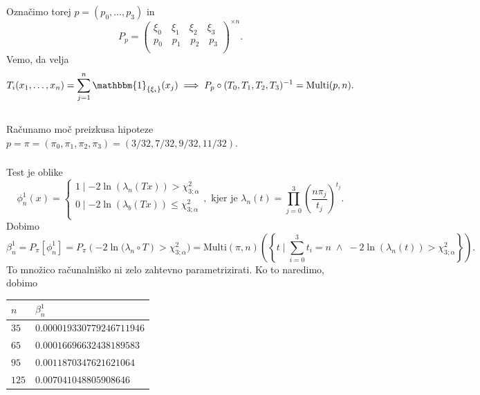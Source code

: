 \documentclass[ letterpaper, titlepage, fleqn]{article}
\newcommand{\ind}{\mathbbm{1}}
\begin{document}
\section{}
Označimo torej $p = (p_0, \dots, p_3)$ in
$$
P_p = \left(
\begin{array}{ll}
\xi_0 \quad \xi_1 \quad \xi_2 \quad \xi_3 \\
p_0 \quad p_1 \quad p_2 \quad p_3 \\
\end{array}
\right)^{\times n}.
$$
Vemo, da velja
$$T_i(x_1, \dots, x_n) = \sum_{j=1}^n \ind_{\{\xi_i\}}(x_j) \implies P_p \circ (T_0, T_1, T_2, T_{3})^{-1} = \text{Multi}(p,n).$$
\subsection{}
Računamo moč preizkusa hipoteze $p = \pi = (\pi_0, \pi_1, \pi_2, \pi_3) =  (3/32, 7/32, 9/32, 11/32)$.
\subsubsection{}
Test je oblike
$$
\phi^1_n(x)= 
\begin{cases}
1 \mid  -2 \ln(\lambda_n(Tx)) > \chi_{3; \alpha}^2 \\
0 \mid  -2 \ln(\lambda_b(Tx)) \leq \chi_{3; \alpha}^2 \\
\end{cases}, \text{ kjer je }
\lambda_n(t) = \prod_{j=0}^3 \left(\frac{n \pi_j}{t_j}\right)^{t_j}.
$$
Dobimo
\begin{equation*}
\beta^1_n = P_\pi[\phi^1_n] = P_\pi\left(-2\ln(\lambda_n \circ T\right) > \chi_{3;\alpha}^2) =
 \text{Multi}(\pi,n)\left(\left\{t\mid \sum_{i=0}^3 t_i = n \;\land\; -2\ln(\lambda_n(t)) > \chi_{3;\alpha}^2\right\}\right).
\end{equation*}
To množico računalniško ni zelo zahtevno parametrizirati. Ko to naredimo, dobimo
\begin{center}
\begin{tabular}{ l | l }
$n$ & $\beta^1_n$ \\
\hline
$35$ & $0.000019330779246711946$ \\
$65$ & $0.00016696632438189583$ \\
$95$ & $0.0011870347621621064$ \\
$125$ & $0.007041048805908646$ 
\end{tabular}
\end{center}
\end{document}
